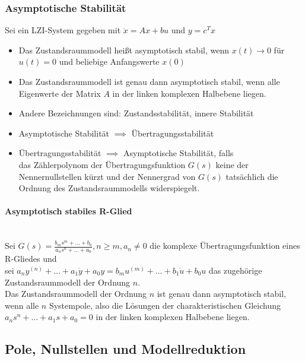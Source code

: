 \documentclass[10pt,a4paper]{article}
\begin{document}
\subsubsection{Asymptotische Stabilität}
Sei ein LZI-System gegeben mit $\dot x = Ax + bu$ und $y = c^T x$
\begin{itemize}
	\item Das Zustandsraummodell heißt asymptotisch stabil, wenn $x(t) → 0$ für $u(t) = 0$ und beliebige Anfangswerte $x(0)$
	\item Das Zustandsraummodell ist genau dann asymptotisch stabil, wenn alle Eigenwerte der Matrix $A$ in der linken komplexen Halbebene liegen.
	\item Andere Bezeichnungen sind: Zustandsstabilität, innere Stabilität
	\item Asymptotische Stabilität $\implies$ Übertragungsstabilität
	\item Übertragungsstabilität $\implies$ Asymptotische Stabilität, falls \\ das Zählerpolynom der Übertragungsfunktion $G(s)$ keine der Nennernullstellen kürzt und der Nennergrad von $G(s)$ tatsächlich die Ordnung des Zustandsraummodells widerspiegelt.
\end{itemize}

\paragraph{Asymptotisch stabiles R-Glied} ~\\
Sei $G(s) = \frac{b_m s^m + \dots + b_0}{a_n s^n + \dots + a_0}, n ≥ m, a_n ≠ 0$ die komplexe Übertragungsfunktion eines R-Gliedes und \\
sei $a_n y^{(n)} + \dots + a_1 \dot y + a_0 y = b_m u^{(m)} + \dots + b_1 \dot u + b_0 u$ das zugehörige Zustandsraummodell der Ordnung $n$. \\
Das Zustandsraummodell der Ordnung $n$ ist genau dann asymptotisch stabil, wenn alle $n$ Systempole, also die Lösungen der charakteristischen Gleichung $a_n s^n + \dots + a_1 s + a_0 = 0$ in der linken komplexen Halbebene liegen.

\subsection{Pole, Nullstellen und Modellreduktion}
\end{document}
